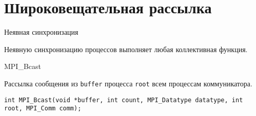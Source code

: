 \section{Широковещательная рассылка}

\begin{frame}{Неявная синхронизация}

Неявную синхронизацию процессов выполняет любая коллективная функция.

\end{frame}

\begin{frame}[fragile]{MPI_Bcast}

Рассылка сообщения из \texttt{buffer} процесса \texttt{root} всем процессам коммуникатора.

\begin{lstlisting}
int MPI_Bcast(void *buffer, int count, MPI_Datatype datatype, int root, MPI_Comm comm);
\end{lstlisting}

\end{frame}


